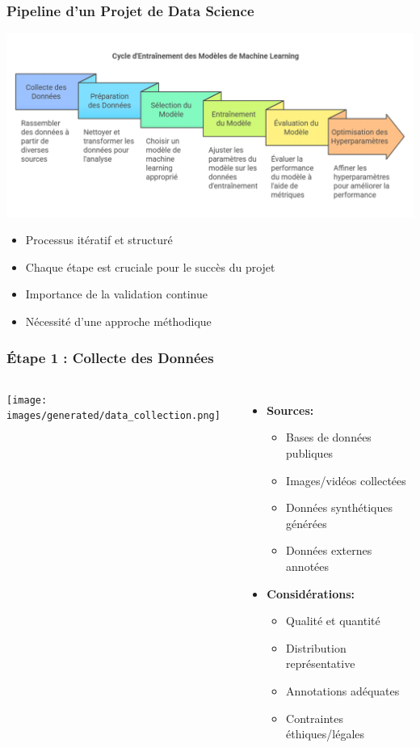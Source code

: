 \documentclass{beamer}
\begin{document}
\begin{frame}
    \frametitle{Pipeline d'un Projet de Data Science}
    \begin{center}
        \includegraphics[width=\textwidth]{images/data_pipeline.png}
    \end{center}
    \begin{itemize}
        \item Processus itératif et structuré
        \item Chaque étape est cruciale pour le succès du projet
        \item Importance de la validation continue
        \item Nécessité d'une approche méthodique
    \end{itemize}
\end{frame}

\begin{frame}
    \frametitle{Étape 1 : Collecte des Données}
    \begin{columns}
        \texttt{[image: images/generated/data\_collection.png]}
        \begin{itemize}
            \item \textbf{Sources:}
            \begin{itemize}
                \item Bases de données publiques
                \item Images/vidéos collectées
                \item Données synthétiques générées
                \item Données externes annotées
            \end{itemize}
            \item \textbf{Considérations:}
            \begin{itemize}
                \item Qualité et quantité
                \item Distribution représentative
                \item Annotations adéquates
                \item Contraintes éthiques/légales
            \end{itemize}
        \end{itemize}
    \end{columns}
\end{frame}
\end{document}
